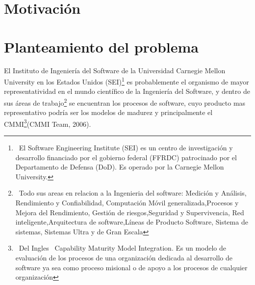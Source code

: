 \section{Motivación}




\section{Planteamiento del problema}
El Instituto de Ingeniería del Software de la Universidad Carnegie Mellon University en los Estados Unidos (SEI)\footnote{\ El Software Engineering Institute (SEI) es un centro de investigación y desarrollo financiado por el gobierno federal (FFRDC) patrocinado por el Departamento de Defensa (DoD). Es operado por la Carnegie Mellon University.} es probablemente el organismo de mayor representatividad en el mundo científico de la Ingeniería del Software, y dentro de sus áreas de trabajo\footnote{\ Todo sus areas en relacion a la Ingenieria del software: Medición y Análisis, Rendimiento y Confiabilidad, Computación Móvil generalizada,Procesos y Mejora del Rendimiento, Gestión de riesgos,Seguridad y Supervivencia, Red inteligente,Arquitectura de software,Líneas de Producto Software, Sistema de sistemas, Sistemas Ultra y de Gran Escala } se encuentran los procesos de software, cuyo producto mas representativo podría ser los modelos de madurez y principalmente el CMMI\footnote{\ Del Ingles \ Capability Maturity Model Integration. Es un modelo de evaluación de los procesos de una organización dedicada al desarrollo de software ya sea como proceso misional o de apoyo a los procesos de cualquier organización}(CMMI Team, 2006).

